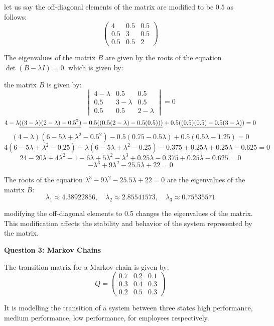 \documentclass{article}
\begin{document}
let us say the off-diagonal elements of the matrix are modified to be \(0.5\) as follows:
\[\begin{pmatrix}
4 & 0.5 & 0.5 \\
0.5 & 3 & 0.5 \\
0.5 & 0.5 & 2
\end{pmatrix}\]

The eigenvalues of the matrix \(B\) are given by the roots of the equation \(\det(B - \lambda I) = 0\). which is given by:

the matrix \(B\) is given by:
\[\begin{vmatrix}
4-\lambda & 0.5 & 0.5 \\
0.5 & 3-\lambda & 0.5 \\
0.5 & 0.5 & 2-\lambda
\end{vmatrix} = 0\]
\[4-\lambda\uline{((3-\lambda)(2-\lambda) - 0.5^2)} - \uline{0.5((0.5(2-\lambda) - 0.5(0.5)))} + 0.5(\uline{(0.5)(0.5)-0.5(3-\lambda)}) = 0\]
\[(4-\lambda)(6 - 5\lambda + \lambda^2 - 0.5^2) - 0.5(0.75-0.5\lambda) + 0.5(0.5\lambda -1.25) = 0\]
\[4(6 - 5\lambda + \lambda^2 - 0.25) -\lambda(6-5\lambda + \lambda^2 - 0.25) - 0.375 + 0.25\lambda + 0.25\lambda - 0.625 = 0\]
\[24 - 20\lambda + 4\lambda^2 - 1 - 6\lambda + 5\lambda^2 - \lambda^3 + 0.25\lambda - 0.375 + 0.25\lambda - 0.625 = 0\]
\[-\lambda^3 + 9\lambda^2 - 25.5\lambda + 22 = 0\]

The roots of the equation \(\lambda^3 - 9\lambda^2 -25.5\lambda + 22 = 0\) are the eigenvalues of the matrix \(B\):
\[\lambda_1 \approx 4.38922856, \quad \lambda_2 \approx 2.85541573, \quad \lambda_3 \approx 0.75535571\]

modifying the off-diagonal elements to 0.5 changes the eigenvalues of the matrix. This modification affects the stability and behavior of the system represented by the matrix.

\begin{center}
    \large \textbf{Question 3: Markov Chains}
\end{center}

The transition matrix for a Markov chain is given by:
\[Q=\begin{pmatrix}
0.7 & 0.2 & 0.1 \\
0.3 & 0.4 & 0.3 \\
0.2 & 0.5 & 0.3
\end{pmatrix}\]

It is modelling the transition of a system between three states high performance, medium performance, low performance, for employees respectively.
\end{document}
